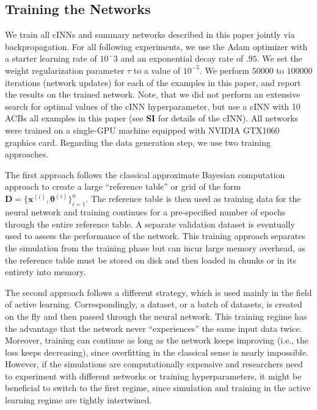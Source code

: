 \documentclass[9pt,twoside,lineno]{pnas-new}
\begin{document}
\subsection*{Training the Networks}
We train all cINNs and summary networks described in this paper jointly via backpropagation. For all following experiments, we use the Adam optimizer  with a starter learning rate of $10^-3$ and an exponential decay rate of $.95$. We set the weight regularization parameter $\tau$ to a value of $10^{-5}$. We perform $50000$ to $100000$ iterations (network updates) for each of the examples in this paper, and report the results on the trained network. Note, that we did not perform an extensive search for optimal values of the cINN hyperparameter, but use a cINN with 10 ACBs all examples in this paper (see \textbf{SI} for details of the cINN). All networks were trained on a single-GPU machine equipped with NVIDIA GTX1060 graphics card. Regarding the data generation step, we use two training approaches. 

The first approach follows the classical approximate Bayesian computation approach to create a large “reference table” or grid of the form $\boldsymbol{D} = \{\boldsymbol{x}^{(i)}, \boldsymbol{\theta}^{(i)}\}_{i=1}^{n}$. The reference table is then used as training data for the neural network and training continues for a pre-specified number of epochs through the entire reference table. A separate validation dataset is eventually used to assess the performance of the network. This training approach separates the simulation from the training phase but can incur large memory overhead, as the reference table must be stored on disk and then loaded in chunks or in its entirety into memory. 

The second approach follows a different strategy, which is used mainly in the field of active learning. Correspondingly, a dataset, or a batch of datasets, is created on the fly and then passed through the neural network. This training regime has the advantage that the network never “experiences” the same input data twice. Moreover, training can continue as long as the network keeps improving (i.e., the loss keeps decreasing), since overfitting in the classical sense is nearly impossible. However, if the simulations are computationally expensive and researchers need to experiment with different networks or training hyperparameters, it might be beneficial to switch to the first regime, since simulation and training in the active learning regime are tightly intertwined.
\end{document}

